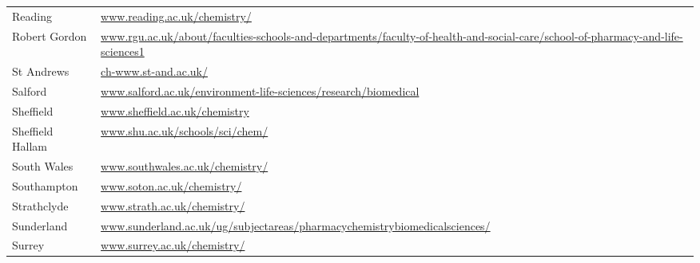 \begin{table}[H]
\begin{tabular}{||p{4cm}|Y||}
\footnotesize{Reading               }             & \footnotesize{\url{www.reading.ac.uk/chemistry/}}                                                                                                  \\
 \footnotesize{Robert Gordon        }              & \footnotesize{\url{www.rgu.ac.uk/about/faculties-schools-and-departments/faculty-of-health-and-social-care/school-of-pharmacy-and-life-sciences1}} \\
 \footnotesize{St Andrews          }               & \footnotesize{\url{ch-www.st-and.ac.uk/}}                                                                                                          \\
 \footnotesize{Salford            }                & \footnotesize{\url{www.salford.ac.uk/environment-life-sciences/research/biomedical}}                                                               \\
 \footnotesize{Sheffield         }                 & \footnotesize{\url{www.sheffield.ac.uk/chemistry}}                                                                                                 \\
 \footnotesize{Sheffield Hallam }                  & \footnotesize{\url{www.shu.ac.uk/schools/sci/chem/}}                                                                                               \\
 \footnotesize{South Wales  }                      & \footnotesize{\url{www.southwales.ac.uk/chemistry/}}                                                                                               \\
 \footnotesize{Southampton }                       & \footnotesize{\url{www.soton.ac.uk/chemistry/}}                                                                                                    \\
 \footnotesize{Strathclyde}                        & \footnotesize{\url{www.strath.ac.uk/chemistry/}}                                                                                                   \\
 \footnotesize{Sunderland}                         & \footnotesize{\url{www.sunderland.ac.uk/ug/subjectareas/pharmacychemistrybiomedicalsciences/}}                                                     \\
 \footnotesize{Surrey }                            & \footnotesize{\url{www.surrey.ac.uk/chemistry/}}                                                                                                   \\

\end{tabular}
\end{table}
